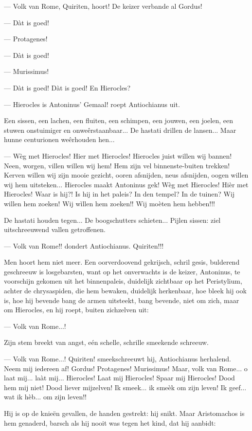 \documentclass[a4paper, 12pt, oneside, dutch]{article}
\begin{document}
--- Volk van Rome, Quiriten, hoort! De keizer verbande al Gordus!

--- Dàt is goed!

--- Protagenes!

--- Dàt is goed!

--- Murissimus!

--- Dàt is goed! Dàt is goed! En Hierocles?

--- Hierocles is Antoninus' Gemaal! roept Antiochianus uit.

Een sissen, een lachen, een fluiten, een schimpen, een jouwen, een joelen, een stuwen onstuimiger en onweêrstaanbaar... De hastati drillen de lansen... Maar hunne centurionen weêrhouden hen...

--- Wèg met Hierocles! Hier met Hierocles! Hierocles juist willen wij bannen! Neen, worgen, villen willen wij hem! Hem zijn vel binnenste-buiten trekken! Kerven willen wij zijn mooie gezicht, ooren afsnijden, neus afsnijden, oogen willen wij hem uitsteken... Hierocles maakt Antoninus gek! Wèg met Hierocles! Hièr met Hierocles! Waar is hij?! Is hij in het paleis? In den tempel? In de tuinen? Wij willen hem zoeken! Wij wìllen hem zoeken!! Wij moèten hem hebben!!!

De hastati houden tegen... De boogschutters schieten... Pijlen sissen: ziel uitschreeuwend vallen getroffenen.

--- Volk van Rome!! dondert Antiochianus. Quiriten!!!

Men hoort hem niet meer. Een oorverdoovend gekrijsch, schril gesis, bulderend geschreeuw is losgebarsten, want op het onverwachts is de keizer, Antoninus, te voorschijn gekomen uit het binnenpaleis, duidelijk zichtbaar op het Peristylium, achter de chrysaspiden, die hem bewaken, duidelijk herkenbaar, hoe bleek hij ook is, hoe hij bevende bang de armen uitsteekt, bang bevende, niet om zich, maar om Hierocles, en hij roept, buiten zichzelven uit:

--- Volk van Rome...!

Zijn stem breekt van angst, eén schelle, schrille smeekende schreeuw.

--- Volk van Rome...! Quiriten! smeekschreeuwt hij, Antiochianus herhalend. Neem mij iedereen af! Gordus! Protagenes! Murissimus! Maar, volk van Rome... o laat mij... laàt mij... Hierocles! Laat mij Hierocles! Spaar mij Hierocles! Dood hem mij niet! Dood liever mijzelven! Ik smeek... ik smeèk om zijn leven! Ik geef... wat ik hèb... om zijn leven!!

Hij is op de knieën gevallen, de handen gestrekt: hij snikt. Maar Aristomachos is hem genaderd, barsch als hij nooit was tegen het kind, dat hij aanbidt:
\end{document}

